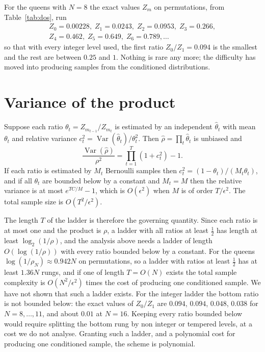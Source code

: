 \documentclass[11pt,twoside,openany]{book}
\theoremstyle{plain}
\theoremstyle{definition}
\theoremstyle{remark}
\DeclareMathOperator{\Var}{Var}
\begin{document}
For the queens with $N = 8$ the exact values $Z_m$ on permutations, from Table~\ref{tab:dos}, run
\[
\begin{gathered}
Z_0 = 0.00228, \; Z_1 = 0.0243, \; Z_2 = 0.0953, \; Z_3 = 0.266, \\ Z_4 = 0.462, \; Z_5 = 0.649, \; Z_6 = 0.789, \dots
\end{gathered}
\]
so that with every integer level used, the first ratio $Z_0 / Z_1 = 0.094$ is the smallest and the rest are between $0.25$ and $1$. Nothing is rare any more; the difficulty has moved into producing samples from the conditioned distributions.

\section{Variance of the product}

Suppose each ratio $\theta_t = Z_{m_{t-1}} / Z_{m_t}$ is estimated by an independent $\hat\theta_t$ with mean $\theta_t$ and relative variance $c_t^2 = \Var(\hat\theta_t) / \theta_t^2$. Then $\hat\rho = \prod_t \hat\theta_t$ is unbiased and
\[
\frac{\Var(\hat\rho)}{\rho^2} = \prod_{t=1}^{T} (1 + c_t^2) - 1 .
\]
If each ratio is estimated by $M_t$ Bernoulli samples then $c_t^2 = (1 - \theta_t) / (M_t \theta_t)$, and if all $\theta_t$ are bounded below by a constant and $M_t = M$ then the relative variance is at most $e^{T C / M} - 1$, which is $O(\epsilon^2)$ when $M$ is of order $T / \epsilon^2$. The total sample size is $O(T^2 / \epsilon^2)$.

The length $T$ of the ladder is therefore the governing quantity. Since each ratio is at most one and the product is $\rho$, a ladder with all ratios at least $\tfrac12$ has length at least $\log_2(1/\rho)$, and the analysis above needs a ladder of length $O(\log(1/\rho))$ with every ratio bounded below by a constant. For the queens $\log(1/\rho_N) \approx 0.942 N$ on permutations, so a ladder with ratios at least $\tfrac12$ has at least $1.36 N$ rungs, and if one of length $T = O(N)$ exists the total sample complexity is $O(N^2 / \epsilon^2)$ times the cost of producing one conditioned sample. We have not shown that such a ladder exists. For the integer ladder the bottom ratio is not bounded below: the exact values of $Z_0 / Z_1$ are $0.094$, $0.094$, $0.048$, $0.038$ for $N = 8, \dots, 11$, and about $0.01$ at $N = 16$. Keeping every ratio bounded below would require splitting the bottom rung by non integer or tempered levels, at a cost we do not analyse. Granting such a ladder, and a polynomial cost for producing one conditioned sample, the scheme is polynomial.
\end{document}
